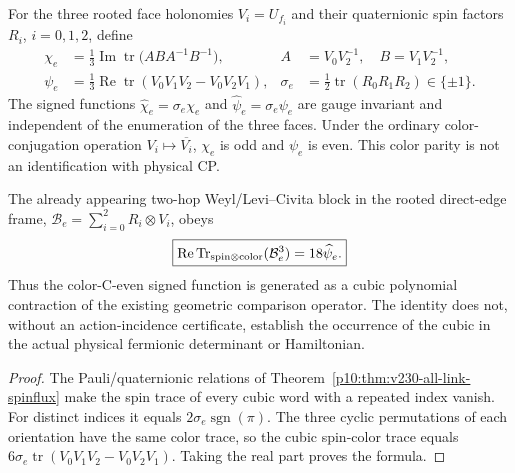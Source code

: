 \documentclass[12pt,a4paper]{article}
\begin{document}
\begin{definition}
\label{p10:def:v235-signed-fan-operators}
For the three rooted face holonomies \(V_i=U_{f_i}\) and their
quaternionic spin factors \(R_i\), \(i=0,1,2\), define
\[
 \begin{aligned}
 \chi_e&=\tfrac13\operatorname{Im}\operatorname{tr}
 \bigl(ABA^{-1}B^{-1}\bigr),&
 A&=V_0V_2^{-1},\quad B=V_1V_2^{-1},\\
 \psi_e&=\tfrac13\operatorname{Re}\operatorname{tr}
 (V_0V_1V_2-V_0V_2V_1),&
 \sigma_e&=\tfrac12\operatorname{tr}(R_0R_1R_2)\in\{\pm1\}.
 \end{aligned}
\]
The signed functions \(\widehat\chi_e=\sigma_e\chi_e\) and
\(\widehat\psi_e=\sigma_e\psi_e\) are gauge invariant and independent
of the enumeration of the three faces.  Under the ordinary
color-conjugation operation \(V_i\mapsto\overline{V_i}\), \(\chi_e\)
is odd and \(\psi_e\) is even.  This color parity is not an
identification with physical CP.
\end{definition}

\begin{theorem}
\label{p10:thm:v235-rooted-weyl-cubic}
The already appearing two-hop Weyl/Levi--Civita block in the
rooted direct-edge frame,
\(\mathcal B_e=\sum_{i=0}^2R_i\otimes V_i\), obeys
\[
 \boxed{\operatorname{Re}\operatorname{Tr}_{\rm spin\otimes color}
 (\mathcal B_e^3)=18\widehat\psi_e.}
\]
Thus the color-C-even signed function is generated as a cubic
polynomial contraction of the existing geometric comparison operator.
The identity does not, without an action-incidence certificate,
establish the occurrence of the cubic in the actual physical
fermionic determinant or Hamiltonian.
\end{theorem}
\begin{proof}
The Pauli/quaternionic relations of
Theorem~\ref{p10:thm:v230-all-link-spinflux} make the spin trace
of every cubic word with a repeated index vanish.  For distinct
indices it equals \(2\sigma_e\operatorname{sgn}(\pi)\).
The three cyclic permutations of each orientation have the same
color trace, so the cubic spin-color trace equals
\(6\sigma_e\operatorname{tr}(V_0V_1V_2-V_0V_2V_1)\).
Taking the real part proves the formula.
\end{proof}
\end{document}

